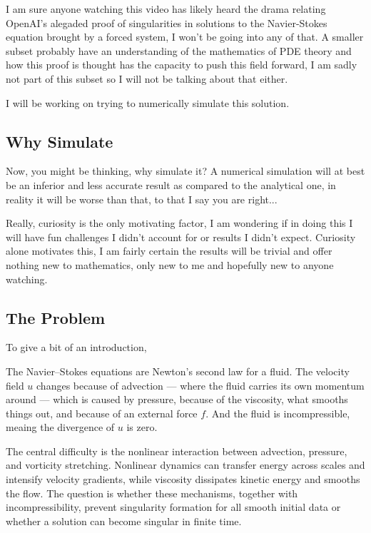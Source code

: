 I am sure anyone watching this video has likely heard the drama relating OpenAI's alegaded proof of singularities in solutions to the Navier-Stokes equation brought by a forced system, I won't be going into any of that. A smaller subset probably have an understanding of the mathematics of PDE theory and how this proof is thought has the capacity to push this field forward, I am sadly not part of this subset so I will not be talking about that either.


I will be working on trying to numerically simulate this solution.

\subsection{Why Simulate}

Now, you might be thinking, why simulate it? A numerical simulation will at best be an inferior and less accurate result as compared to the analytical one, in reality it will be worse than that, to that I say you are right...

Really, curiosity is the only motivating factor, I am wondering if in doing this I will have fun challenges I didn't account for or results I didn't expect. Curiosity alone motivates this, I am fairly certain the results will be trivial and offer nothing new to mathematics, only new to me and hopefully new to anyone watching.


\subsection{The Problem}
To give a bit of an introduction,

The Navier--Stokes equations are Newton's second law for a fluid. The velocity field $u$ changes because of advection --- where the fluid carries its own momentum around --- which is caused by pressure, because of the viscosity, what smooths things out, and because of an external force $f$. And the fluid is incompressible, meaing the divergence of $u$ is zero.

The central difficulty is the nonlinear interaction between advection, pressure, and vorticity stretching. Nonlinear dynamics can transfer energy across scales and intensify velocity gradients, while viscosity dissipates kinetic energy and smooths the flow. The question is whether these mechanisms, together with incompressibility, prevent singularity formation for all smooth initial data or whether a solution can become singular in finite time.

